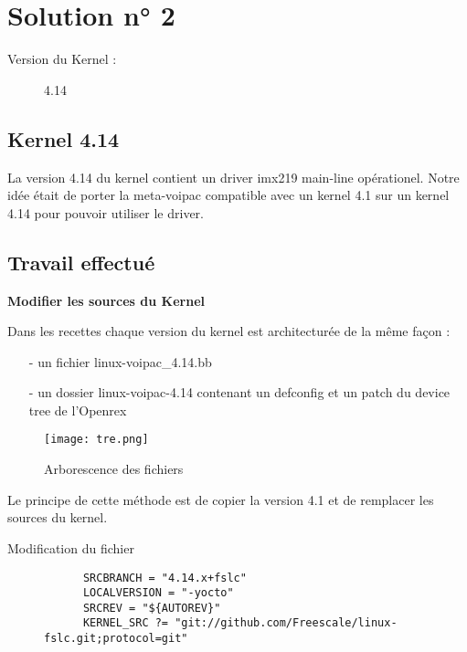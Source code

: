 
\chapter{Solution n° 2} %

\label{Chapter3} %
\begin{description}
  \item[Version du Kernel :] 4.14
\end{description}

\section{Kernel 4.14}
La version 4.14 du kernel contient un driver imx219
main-line opérationel. Notre idée était de porter la meta-voipac compatible
avec un kernel 4.1 sur un kernel 4.14 pour pouvoir utiliser le driver.

\section{Travail effectué}
\textbf{Modifier les sources du Kernel}

 Dans les recettes chaque version du kernel est architecturée de la même façon :
  \begin{itemize}
  \item[-] un fichier linux-voipac\_4.14.bb
  \item[-] un dossier linux-voipac-4.14 contenant un defconfig et un patch du device tree de l'Openrex
  \end{itemize}

\begin{figure}[th]
  \centering
  \texttt{[image: tre.png]}
  \decoRule
  \caption{Arborescence des fichiers}  \label{fig:arborescence4.14}
\end{figure}

Le principe de cette méthode est de copier la version 4.1 et de remplacer les sources du kernel. 

\begin{description}
  \item[Modification du fichier]
    \begin{lstlisting}
      SRCBRANCH = "4.14.x+fslc"
      LOCALVERSION = "-yocto"
      SRCREV = "${AUTOREV}"
      KERNEL_SRC ?= "git://github.com/Freescale/linux-fslc.git;protocol=git"
    \end{lstlisting}
\end{description}

